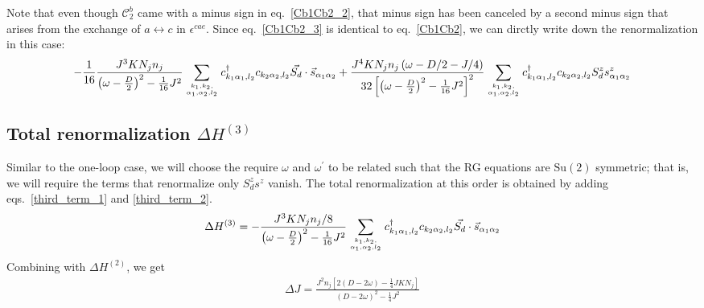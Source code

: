 \documentclass{revtex4-2}
\numberwithin{equation}{section}
\begin{document}
Note that even though \(\mathcal{C}^b_2\) came with a minus sign in eq.~\ref{Cb1Cb2_2}, that minus sign has been canceled by a second minus sign that arises from the exchange of \(a \leftrightarrow c\) in \(\epsilon^{cae}\). Since eq.~\ref{Cb1Cb2_3} is identical to eq.~\ref{Cb1Cb2}, we can dirctly write down the renormalization in this case:
\begin{equation}\begin{aligned}
	\label{third_term_2}
	-\frac{1}{16}\frac{J^3 K N_j n_j }{\left(\omega - \frac{D}{2}\right)^2 - \frac{1}{16}J^2}\sum_{k_1,k_2,\atop{\alpha_1,\alpha_2,l_2}}c^\dagger_{k_1\alpha_1,l_2}c_{k_2 \alpha_2,l_2} \vec{S_d}\cdot\vec{s}_{\alpha_1\alpha_2} + \frac{J^4 K N_j n_j \left( \omega - D/2 - J/4 \right) }{32\left[\left(\omega - \frac{D}{2}\right)^2 - \frac{1}{16}J^2\right]^2}\sum_{k_1,k_2,\atop{\alpha_1,\alpha_2,l_2}} c^\dagger_{k_1 \alpha_1,l_2}c_{k_2 \alpha_2,l_2}S_d^z s^z_{\alpha_1\alpha_2}
\end{aligned}\end{equation}

\subsection{Total renormalization \(\Delta H^{(3)}\)}
Similar to the one-loop case, we will choose the require \(\omega\) and \(\omega^\prime\) to be related such that the  RG equations are \(\mathrm{Su}(2)\) symmetric; that is, we will require the terms that renormalize only \(S_d^z s^z\) vanish. The total renormalization at this order is obtained by adding eqs.~\ref{third_term_1} and \ref{third_term_2}.
\begin{equation}\begin{aligned}
	\Delta H^{(3)} = -\frac{J^3 K N_j n_j / 8}{\left(\omega - \frac{D}{2}\right)^2 - \frac{1}{16}J^2}\sum_{k_1,k_2,\atop{\alpha_1,\alpha_2,l_2}}c^\dagger_{k_1\alpha_1,l_2}c_{k_2 \alpha_2,l_2} \vec{S_d}\cdot\vec{s}_{\alpha_1\alpha_2}
\end{aligned}\end{equation}
Combining with \(\Delta H^{(2)}\), we get
\begin{equation}\begin{aligned}
	\Delta J = \frac{J^2 n_j \left[2 \left(D - 2\omega\right) - \frac{1}{4}J K N_j\right]}{\left(D - 2\omega\right)^2 - \frac{1}{4}J^2}
\end{aligned}\end{equation}
\end{document}
